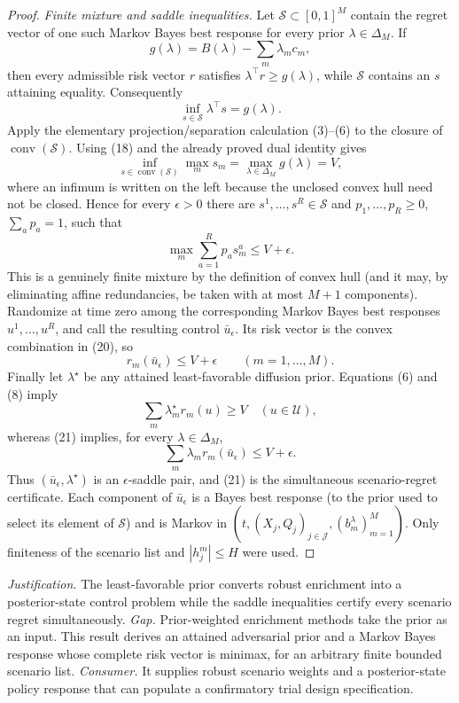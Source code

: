 \documentclass{article}
\begin{document}
\begin{proof}
\emph{Finite mixture and saddle inequalities.}  Let \(\mathcal S\subset[0,1]^M\) contain the regret vector of one such Markov Bayes best response for every prior \(\lambda\in\Delta_M\).  If
\[
 g(\lambda)=B(\lambda)-\sum_m\lambda_mc_m,
\]
then every admissible risk vector \(r\) satisfies \(\lambda^\top r\geq g(\lambda)\), while \(\mathcal S\) contains an \(s\) attaining equality.  Consequently
\[
 \inf_{s\in\mathcal S}\lambda^\top s=g(\lambda).               \tag{18}
\]
Apply the elementary projection/separation calculation (3)--(6) to the closure of \(\operatorname{conv}(\mathcal S)\).  Using (18) and the already proved dual identity gives
\[
 \inf_{s\in\operatorname{conv}(\mathcal S)}\max_ms_m
 =\max_{\lambda\in\Delta_M}g(\lambda)=V,                        \tag{19}
\]
where an infimum is written on the left because the unclosed convex hull need not be closed.  Hence for every \(\epsilon>0\) there are \(s^1,\ldots,s^R\in\mathcal S\) and \(p_1,\ldots,p_R\geq0\), \(\sum_ap_a=1\), such that
\[
 \max_m\sum_{a=1}^Rp_as_m^a\leq V+\epsilon.                    \tag{20}
\]
This is a genuinely finite mixture by the definition of convex hull (and it may, by eliminating affine redundancies, be taken with at most \(M+1\) components).  Randomize at time zero among the corresponding Markov Bayes best responses \(u^1,\ldots,u^R\), and call the resulting control \(\bar u_\epsilon\).  Its risk vector is the convex combination in (20), so
\[
 r_m(\bar u_\epsilon)\leq V+\epsilon\qquad(m=1,\ldots,M).       \tag{21}
\]
Finally let \(\lambda^\star\) be any attained least-favorable diffusion prior.  Equations (6) and (8) imply
\[
 \sum_m\lambda_m^\star r_m(u)\geq V
 \quad(u\in\mathcal U),                                         \tag{22}
\]
whereas (21) implies, for every \(\lambda\in\Delta_M\),
\[
 \sum_m\lambda_m r_m(\bar u_\epsilon)\leq V+\epsilon.          \tag{23}
\]
Thus \((\bar u_\epsilon,\lambda^\star)\) is an \(\epsilon\)-saddle pair, and (21) is the simultaneous scenario-regret certificate.  Each component of \(\bar u_\epsilon\) is a Bayes best response (to the prior used to select its element of \(\mathcal S\)) and is Markov in \((t,(X_j,Q_j)_{j\in\mathcal J},(b_m^\lambda)_{m=1}^M)\).  Only finiteness of the scenario list and \(|h_j^m|\leq H\) were used.
\end{proof}
\par\smallskip\noindent \textit{Justification.} The least-favorable prior converts robust enrichment into a posterior-state control problem while the saddle inequalities certify every scenario regret simultaneously. \textit{Gap.} Prior-weighted enrichment methods take the prior as an input. This result derives an attained adversarial prior and a Markov Bayes response whose complete risk vector is minimax, for an arbitrary finite bounded scenario list. \textit{Consumer.} It supplies robust scenario weights and a posterior-state policy response that can populate a confirmatory trial design specification.
\end{document}
